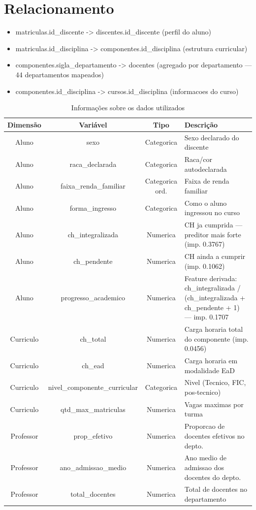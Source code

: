 \section{Relacionamento}
\begin{itemize}
    \item matriculas.id_discente -> discentes.id_discente (perfil do aluno)
    \item matriculas.id_disciplina -> componentes.id_disciplina (estrutura curricular)
    \item componentes.sigla_departamento -> docentes (agregado por departamento — 44 departamentos mapeados)
    \item componentes.id_disciplina -> cursos.id_disciplina (informacoes do curso)
\end{itemize}

\begin{table}[h]
\centering
\caption{Informações sobre os dados utilizados}
\begin{tabular}{|c|c|c|L{10cm}|}
\hline
Dimensão & Variável & Tipo & Descrição \\ 
\hline
Aluno & sexo & Categorica & Sexo declarado do discente \\ 
Aluno & raca_declarada & Categorica & Raca/cor autodeclarada \\ 
Aluno & faixa_renda_familiar & Categorica ord. & Faixa de renda familiar \\ 
Aluno & forma_ingresso & Categorica & Como o aluno ingressou no curso \\ 
Aluno & ch_integralizada & Numerica & CH ja cumprida — preditor mais forte (imp. 0.3767) \\ 
Aluno & ch_pendente & Numerica & CH ainda a cumprir (imp. 0.1062) \\ 
Aluno & progresso_academico & Numerica & Feature derivada: ch_integralizada / (ch_integralizada + ch_pendente + 1) — imp. 0.1707 \\ 
Curriculo & ch_total & Numerica & Carga horaria total do componente (imp. 0.0456) \\ 
Curriculo & ch_ead & Numerica & Carga horaria em modalidade EaD \\ 
Curriculo & nivel_componente_curricular & Categorica & Nivel (Tecnico, FIC, pos-tecnico) \\ 
Curriculo & qtd_max_matriculas & Numerica & Vagas maximas por turma \\ 
Professor & prop_efetivo & Numerica & Proporcao de docentes efetivos no depto. \\ 
Professor & ano_admissao_medio & Numerica & Ano medio de admissao dos docentes do depto. \\ 
Professor & total_docentes & Numerica & Total de docentes no departamento \\ 

\hline
\end{tabular}
\label{tab:exemplo}
\end{table}



